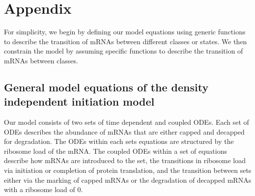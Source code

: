 \documentclass[review]{elsarticle}
\newcommand{\imax}{\ensuremath{{i_{\max}}}\xspace}
\begin{document}
%


 


\section{Appendix}

For simplicity, we begin by defining our model equations using generic functions to describe the transition of mRNAs between different classes or states.
We then constrain the model by assuming specific functions to describe the transition of mRNAs between classes.

\subsection*{General model equations of the density independent initiation model}
Our model consists of two sets of time dependent and coupled ODEs.
Each set of ODEs describes the abundance of mRNAs that are either capped and decapped for degradation.
The ODEs within each sets equations are structured by the ribosome load of the mRNA.
The coupled ODEs within a set of equations describe how mRNAs are introduced to the set, the transitions in ribosome load via initiation or completion of protein translation,  and the transition between sets either via the marking of capped mRNAs or the degradation of decapped mRNAs with a ribosome load of 0.
\end{document}
